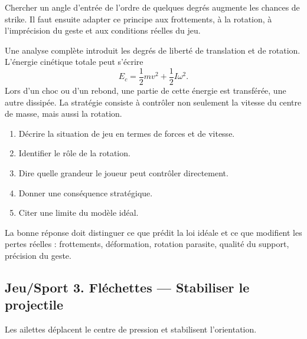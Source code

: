 \documentclass[11pt,a4paper]{article}
\begin{document}
\begin{methodebox}
Chercher un angle d'entrée de l'ordre de quelques degrés augmente les chances de strike.
Il faut ensuite adapter ce principe aux frottements, à la rotation, à l'imprécision du geste et aux conditions réelles du jeu.
\end{methodebox}

\begin{approfondissementbox}
Une analyse complète introduit les degrés de liberté de translation et de rotation. L'énergie cinétique totale peut s'écrire
\[
E_c=\frac12mv^2+\frac12I\omega^2.
\]
Lors d'un choc ou d'un rebond, une partie de cette énergie est transférée, une autre dissipée. La stratégie consiste à contrôler non seulement la vitesse du centre de masse, mais aussi la rotation.
\end{approfondissementbox}

\begin{exercicebox}
\begin{enumerate}
  \item Décrire la situation de jeu en termes de forces et de vitesse.
  \item Identifier le rôle de la rotation.
  \item Dire quelle grandeur le joueur peut contrôler directement.
  \item Donner une conséquence stratégique.
  \item Citer une limite du modèle idéal.
\end{enumerate}
\end{exercicebox}

\begin{corrigebox}[Indication]
La bonne réponse doit distinguer ce que prédit la loi idéale et ce que modifient les pertes réelles : frottements, déformation, rotation parasite, qualité du support, précision du geste.
\end{corrigebox}


\subsection{Jeu/Sport 3. Fléchettes — Stabiliser le projectile}

\begin{exemplebox}[Observation]
Les ailettes déplacent le centre de pression et stabilisent l'orientation.
\end{exemplebox}
\end{document}
